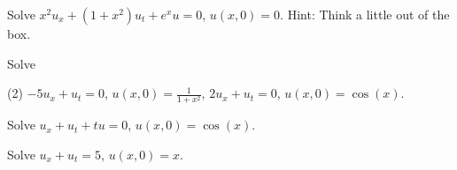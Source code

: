 \begin{exercise}
Solve $x^2 u_x + (1+x^2) u_t + e^x u = 0$, $u(x,0) = 0$.
Hint: Think a little out of the box.
\end{exercise}

\setcounter{exercise}{100}

\begin{exercise}
Solve
\begin{tasks}(2)
\task $-5u_x + u_t = 0$, \enspace $u(x,0) = \frac{1}{1+x^2}$,
\task $2u_x + u_t = 0$, \enspace $u(x,0) = \cos(x)$.
\end{tasks}
\end{exercise}

\begin{exercise}
Solve $u_x+u_t+tu = 0$, $u(x,0) = \cos(x)$.
\end{exercise}

\begin{exercise}
Solve $u_x+u_t = 5$, $u(x,0) = x$.
\end{exercise}
